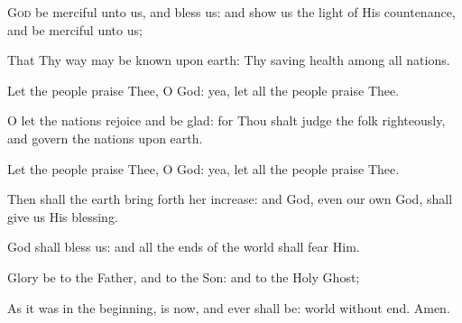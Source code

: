 \lettrine{G}{od} be merciful unto us, and bless us: and show us the light of His countenance, and be merciful unto us;

That Thy way may be known upon earth: Thy saving health among all nations.

Let the people praise Thee, O God: yea, let all the people praise Thee.

O let the nations rejoice and be glad: for Thou shalt 
judge the folk righteously, and govern the nations upon
earth.

Let the people praise Thee, O God: yea, let all the
people praise Thee.

Then shall the earth bring forth her increase: and God, even our own God, shall give us His blessing.

God shall bless us: and all the ends of the world shall fear Him.

Glory be to the Father, and to the Son: and to the Holy Ghost;

As it was in the beginning, is now, and ever shall be: world without end. Amen.
